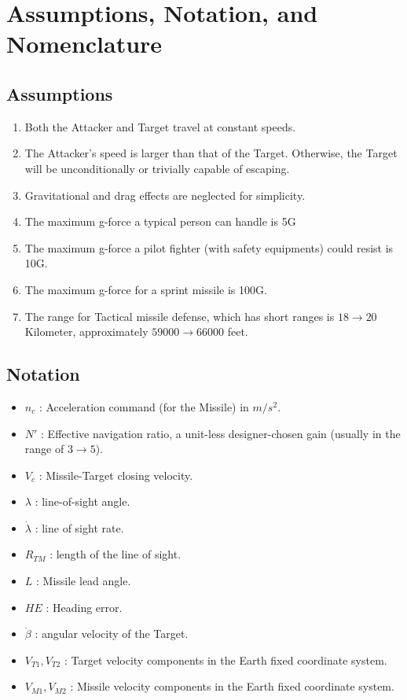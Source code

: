 \section{Assumptions, Notation, and Nomenclature}
\subsection*{Assumptions}

\begin{enumerate}
	\item Both the Attacker and Target travel at constant speeds.
	\item The Attacker's speed is larger than that of the Target. Otherwise, the Target will be unconditionally or trivially capable of escaping. 
	\item Gravitational and drag effects are neglected for simplicity.
	\item The maximum g-force a typical person can handle is 5G
	\item The maximum g-force a pilot fighter (with safety equipments) could resist is 10G.
	\item The maximum g-force for a sprint missile is 100G.
	\item The range for Tactical missile defense, which has short ranges is $18\to 20$ Kilometer, approximately $59000 \to 66000$ feet. 
	
\end{enumerate}

\subsection*{Notation}
\begin{itemize}
	\item $n_c$ : Acceleration command (for the Missile) in $m/s^2$.
	\item $N'$ : Effective navigation ratio, a unit-less designer-chosen gain (usually in the range of $3\to5$).
	\item $V_c$ : Missile-Target closing velocity.
	\item $\lambda$ : line-of-sight angle.
	\item $\dot{\lambda}$ : line of sight rate.
	\item $R_{TM}$ : length of the line of sight.
	\item $L$ : Missile lead angle.
	\item $HE$ : Heading error.
	\item $\dot{\beta}$ : angular velocity of the Target.
	\item $V_{T1},V_{T2}$ : Target velocity components in the Earth fixed coordinate system.
	\item $V_{M1},V_{M2}$ : Missile velocity components in the Earth fixed coordinate system.
\end{itemize}
